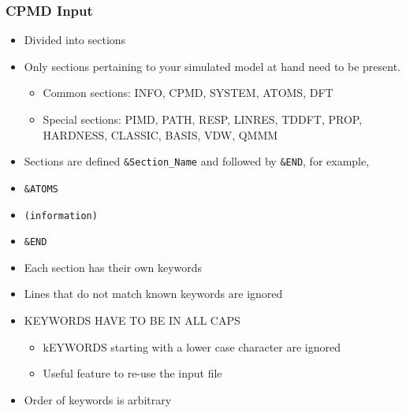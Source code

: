 \documentclass[slidestop,mathserif,compress,xcolor=svgnames]{beamer}
\newenvironment{bblock}[0]
{
\begin{beamerboxesrounded}[upper=uppercol1,lower=lowercol1,shadow=true]}
{\end{beamerboxesrounded}}
\begin{document}
\begin{frame}
  \frametitle{\small CPMD Input}
  \begin{bblock}{}
    \begin{itemize}
    \item Divided into sections
    \item Only sections pertaining to your simulated model at hand need to be present.
      \begin{itemize}
      \item Common sections: INFO, CPMD, SYSTEM, ATOMS, DFT
      \item Special sections: PIMD, PATH, RESP, LINRES, TDDFT,  PROP, HARDNESS, CLASSIC, BASIS, VDW, QMMM
      \end{itemize}
    \item Sections are defined \texttt{\&Section\_Name} and followed by \texttt{\&END}, for example,
    \item[]\texttt{\&ATOMS}  
    \item[]\texttt{\quad(information)}
    \item[]\texttt{\&END}
    \item Each section has their own keywords
    \item Lines that do not match known keywords are ignored
    \item KEYWORDS HAVE TO BE IN ALL CAPS
      \begin{itemize}
      \item kEYWORDS starting with a lower case character are ignored
      \item Useful feature to re-use the input file
      \end{itemize}
    \item Order of keywords is arbitrary
    \end{itemize}
  \end{bblock}
\end{frame}
\end{document}
